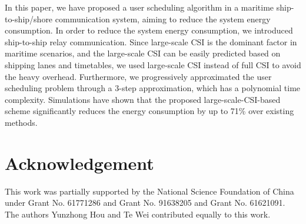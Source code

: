 \documentclass[conference]{IEEEtran}
\begin{document}
 In this paper, we have proposed a user scheduling algorithm in a maritime ship-to-ship/shore communication system, aiming to reduce the system energy consumption. 
 In order to reduce the system energy consumption, we introduced ship-to-ship relay communication. 
 Since large-scale CSI is the dominant factor in maritime scenarios, and the large-scale CSI can be easily predicted based on shipping lanes and timetables, we used large-scale CSI instead of full CSI to avoid the heavy overhead. Furthermore, we progressively approximated the user scheduling problem through a 3-step approximation, which has a polynomial time complexity. Simulations have shown that the proposed large-scale-CSI-based scheme significantly reduces the energy consumption by up to 71\% over existing methods.

 


 
 
 
 
 \section*{Acknowledgement}
 
 This work was partially supported by the National Science Foundation of China under Grant No. 61771286 and Grant No. 91638205 and Grant No. 61621091. The authors Yunzhong Hou and Te Wei contributed equally to this work.
 
\end{document}
